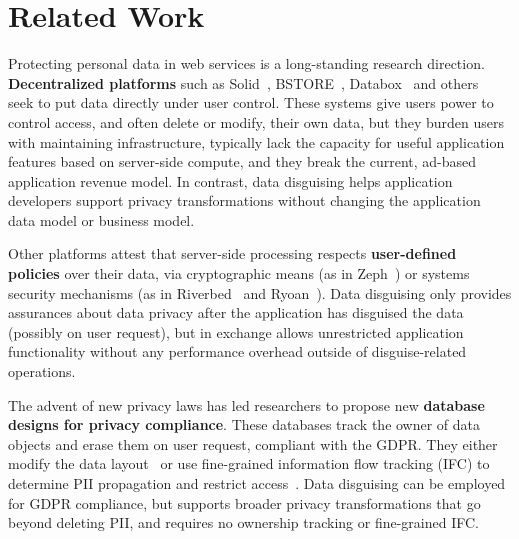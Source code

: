 \section{Related Work}
\label{sec:related}


%
Protecting personal data in web services is a long-standing research direction.
%
\textbf{Decentralized platforms} such as Solid~\cite{solid}, BSTORE~\cite{bstore},
Databox~\cite{databox} and others~\cite{diy, amber, oort, w5, blockstack}
seek to put data directly under user control.
%
These systems give users power to control access, and often delete or modify, their
own data, but they burden users with maintaining infrastructure, typically lack the
capacity for useful application features based on server-side compute, and they break
the current, ad-based application revenue model.
%
In contrast, data disguising helps application developers support privacy
transformations without changing the application data model or business model.
%

%
Other platforms attest that server-side processing respects
\textbf{user-defined policies} over their data, via cryptographic means (as in
\eg Zeph~\cite{zeph}) or systems security mechanisms (as in \eg Riverbed~\cite{riverbed}
and Ryoan~\cite{ryoan}).
%
Data disguising only provides assurances about data privacy after the application has
disguised the data (possibly on user request), but in exchange allows unrestricted
application functionality without any performance overhead outside of disguise-related
operations.
%

%
The advent of new privacy laws has led researchers to propose new \textbf{database designs
for privacy compliance}.
%
These databases track the owner of data objects and erase them on user request, compliant
with \eg the GDPR.
%
They either modify the data layout~\cite{usershards} or use fine-grained information flow
tracking (IFC) to determine PII propagation and restrict access~\cite{schengendb}.
%
Data disguising can be employed for GDPR compliance, but supports broader privacy
transformations that go beyond deleting PII, and requires no ownership tracking or
fine-grained IFC.
%

